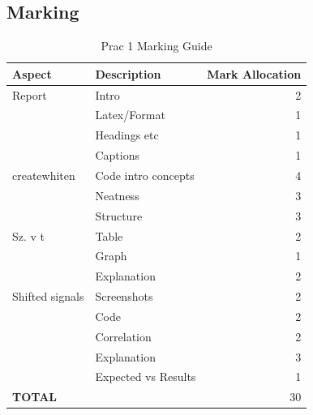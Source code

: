 \subsection{Marking}
\begin{table}[H]
\centering
\caption{Prac 1 Marking Guide}
\label{tbl:Prac1Marks}
\begin{tabular}{|l|l|r|}
\hline
\textbf{Aspect} & \textbf{Description} & \multicolumn{1}{l|}{\textbf{Mark Allocation}} \\ \hline
Report & Intro & 2 \\ \hline
 & Latex/Format & 1 \\ \hline
 & Headings etc & 1 \\ \hline
 & Captions & 1 \\ \hline
createwhiten & Code intro concepts & 4 \\ \hline
 & Neatness & 3 \\ \hline
 & Structure & 3 \\ \hline
Sz. v t & Table & 2 \\ \hline
 & Graph & 1 \\ \hline
 & Explanation & 2 \\ \hline
Shifted signals & Screenshots & 2 \\ \hline
 & Code & 2 \\ \hline
 & Correlation & 2 \\ \hline
 & Explanation & 3 \\ \hline
 & Expected vs Results & 1 \\ \hline
\textbf{TOTAL} &  & 30 \\ \hline
\end{tabular}
\end{table}